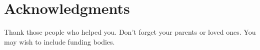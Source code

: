\chapter{Acknowledgments}

Thank those people who helped you. 
Don't forget your parents or loved ones.
You may wish to include funding bodies.
